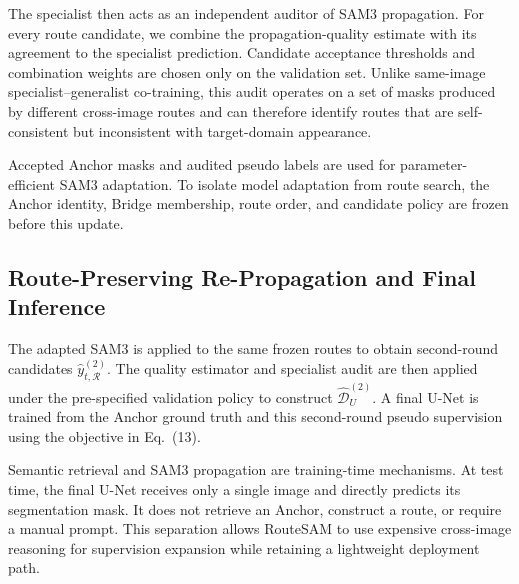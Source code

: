 \documentclass[a4paper,fleqn]{cas-dc}
\begin{document}
The specialist then acts as an independent auditor of SAM3 propagation. For every route candidate, we combine the propagation-quality estimate with its agreement to the specialist prediction. Candidate acceptance thresholds and combination weights are chosen only on the validation set. Unlike same-image specialist--generalist co-training, this audit operates on a set of masks produced by different cross-image routes and can therefore identify routes that are self-consistent but inconsistent with target-domain appearance.

Accepted Anchor masks and audited pseudo labels are used for parameter-efficient SAM3 adaptation. To isolate model adaptation from route search, the Anchor identity, Bridge membership, route order, and candidate policy are frozen before this update.


\subsection{Route-Preserving Re-Propagation and Final Inference}\label{sec:repropagation}

The adapted SAM3 is applied to the same frozen routes to obtain second-round candidates $\hat{y}_{t,\mathcal{R}}^{(2)}$. The quality estimator and specialist audit are then applied under the pre-specified validation policy to construct $\widehat{\mathcal{D}}_{U}^{(2)}$. A final U-Net is trained from the Anchor ground truth and this second-round pseudo supervision using the objective in Eq.~(13).

Semantic retrieval and SAM3 propagation are training-time mechanisms. At test time, the final U-Net receives only a single image and directly predicts its segmentation mask. It does not retrieve an Anchor, construct a route, or require a manual prompt. This separation allows RouteSAM to use expensive cross-image reasoning for supervision expansion while retaining a lightweight deployment path.

\printcredits

%





\end{document}
